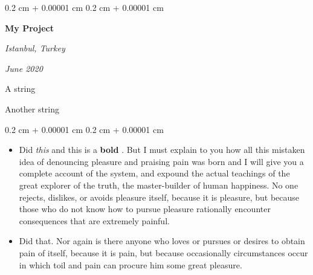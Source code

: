 \documentclass[10pt, letterpaper]{article}
\newenvironment{summary}{
    \begin{description}[
        topsep=0.10 cm,
        parsep=0.10 cm,
        partopsep=0pt,
        itemsep=0pt,
        leftmargin=0.4 cm + 10pt
    ]
}{
    \end{description}
} %
\newenvironment{highlights}{
    \begin{itemize}[
        topsep=0.10 cm,
        parsep=0.10 cm,
        partopsep=0pt,
        itemsep=0pt,
        leftmargin=0.4 cm + 10pt
    ]
}{
    \end{itemize}
} %
\newenvironment{onecolentry}{
    \begin{adjustwidth}{
        0.2 cm + 0.00001 cm
    }{
        0.2 cm + 0.00001 cm
    }
}{
    \end{adjustwidth}
} %
\newenvironment{twocolentry}[2][]{
    \onecolentry
    \def\secondColumn{#2}
    \setcolumnwidth{\fill, 4.5 cm}
    \begin{paracol}{2}
}{
    \switchcolumn \raggedleft \secondColumn
    \end{paracol}
    \endonecolentry
} %
\let\hrefWithoutArrow\href
\renewcommand{\href}[2]{\hrefWithoutArrow{#1}{\ifthenelse{\equal{#2}{}}{ }{#2 }\raisebox{.15ex}{\footnotesize \faExternalLink*}}}
\begin{document}
        \begin{twocolentry}{
        \textit{Istanbul, Turkey}    
            
        \textit{June 2020}}
            \textbf{My Project}
        \end{twocolentry}
            \begin{summary}
                \item A string
                \item Another string
            \end{summary}
        \vspace{0.10 cm}
        \begin{onecolentry}
            \begin{highlights}
                \item Did \textit{this} and this is a \textbf{bold} \href{https://example.com}{link}. But I must explain to you how all this mistaken idea of denouncing pleasure and praising pain was born and I will give you a complete account of the system, and expound the actual teachings of the great explorer of the truth, the master-builder of human happiness. No one rejects, dislikes, or avoids pleasure itself, because it is pleasure, but because those who do not know how to pursue pleasure rationally encounter consequences that are extremely painful.
                \item Did that. Nor again is there anyone who loves or pursues or desires to obtain pain of itself, because it is pain, but because occasionally circumstances occur in which toil and pain can procure him some great pleasure.
            \end{highlights}
        \end{onecolentry}


        \vspace{0.2 cm}
\end{document}
